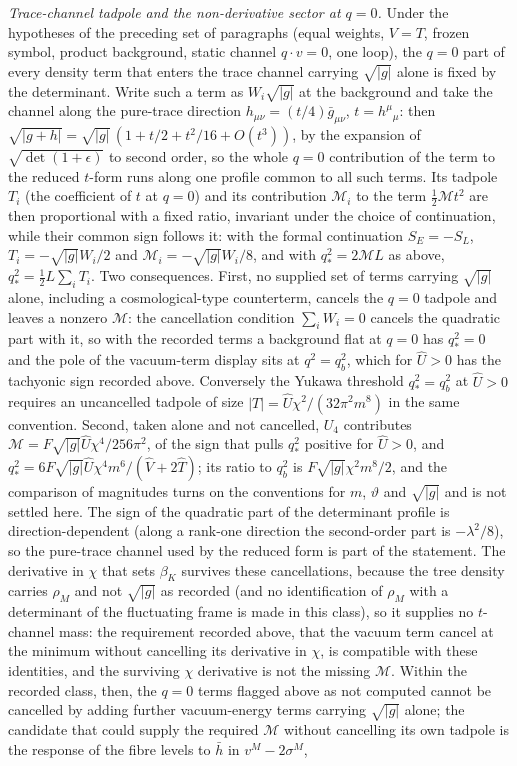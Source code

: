 \emph{Trace-channel tadpole and the non-derivative sector at \(q=0\).} Under the hypotheses of the preceding set of paragraphs (equal weights, \(V=T\), frozen symbol, product background, static channel \(q\cdot v=0\), one loop), the \(q=0\) part of every density term that enters the trace channel carrying \(\sqrt{|g|}\) alone is fixed by the determinant. Write such a term as \(W_i\sqrt{|g|}\) at the background and take the channel along the pure-trace direction \(h_{\mu\nu}=(t/4)\bar g_{\mu\nu}\), \(t=h^\mu{}_\mu\): then \(\sqrt{|g+h|}=\sqrt{|g|}\,(1+t/2+t^2/16+O(t^3))\), by the expansion of \(\sqrt{\det(1+\epsilon)}\) to second order, so the whole \(q=0\) contribution of the term to the reduced \(t\)-form runs along one profile common to all such terms. Its tadpole \(T_i\) (the coefficient of \(t\) at \(q=0\)) and its contribution \(\mathcal M_i\) to the term \(\tfrac12\mathcal Mt^2\) are then proportional with a fixed ratio, invariant under the choice of continuation, while their common sign follows it: with the formal continuation \(S_E=-S_L\), \(T_i=-\sqrt{|g|}W_i/2\) and \(\mathcal M_i=-\sqrt{|g|}W_i/8\), and with \(q_*^2=2\mathcal ML\) as above, \(q_*^2=\tfrac12L\sum_iT_i\). Two consequences. First, no supplied set of terms carrying \(\sqrt{|g|}\) alone, including a cosmological-type counterterm, cancels the \(q=0\) tadpole and leaves a nonzero \(\mathcal M\): the cancellation condition \(\sum_iW_i=0\) cancels the quadratic part with it, so with the recorded terms a background flat at \(q=0\) has \(q_*^2=0\) and the pole of the vacuum-term display sits at \(q^2=q_b^2\), which for \(\hat U>0\) has the tachyonic sign recorded above. Conversely the Yukawa threshold \(q_*^2=q_b^2\) at \(\hat U>0\) requires an uncancelled tadpole of size \(|T|=\hat U\chi^2/(32\pi^2m^8)\) in the same convention. Second, taken alone and not cancelled, \(U_4\) contributes \(\mathcal M=F\sqrt{|g|}\hat U\chi^4/256\pi^2\), of the sign that pulls \(q_*^2\) positive for \(\hat U>0\), and \(q_*^2=6F\sqrt{|g|}\hat U\chi^4m^6/(\hat V+2\hat T)\); its ratio to \(q_b^2\) is \(F\sqrt{|g|}\chi^2m^8/2\), and the comparison of magnitudes turns on the conventions for \(m\), \(\vartheta\) and \(\sqrt{|g|}\) and is not settled here. The sign of the quadratic part of the determinant profile is direction-dependent (along a rank-one direction the second-order part is \(-\lambda^2/8\)), so the pure-trace channel used by the reduced form is part of the statement. The derivative in \(\chi\) that sets \(\beta_K\) survives these cancellations, because the tree density carries \(\rho_M\) and not \(\sqrt{|g|}\) as recorded (and no identification of \(\rho_M\) with a determinant of the fluctuating frame is made in this class), so it supplies no \(t\)-channel mass: the requirement recorded above, that the vacuum term cancel at the minimum without cancelling its derivative in \(\chi\), is compatible with these identities, and the surviving \(\chi\) derivative is not the missing \(\mathcal M\). Within the recorded class, then, the \(q=0\) terms flagged above as not computed cannot be cancelled by adding further vacuum-energy terms carrying \(\sqrt{|g|}\) alone; the candidate that could supply the required \(\mathcal M\) without cancelling its own tadpole is the response of the fibre levels to \(\bar h\) in \(v^M-2\sigma^M\), 